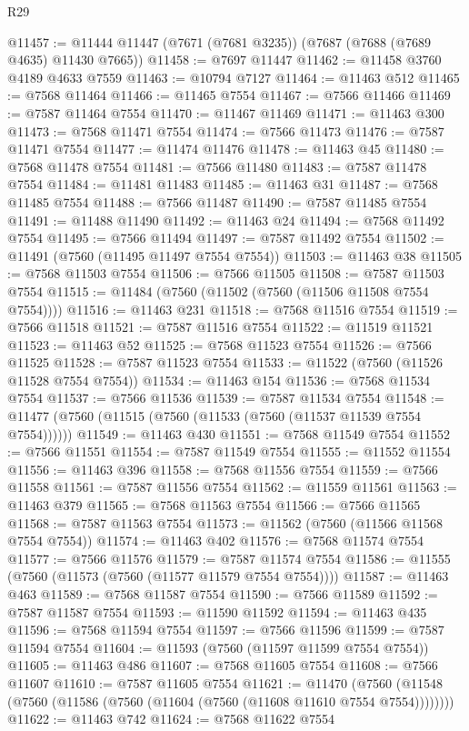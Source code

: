 \begin{lexlean}{R29}
\begin{coremodule}
@11457 := @11444 @11447 (@7671 (@7681 @3235)) (@7687 (@7688 (@7689 @4635) @11430 @7665))
@11458 := @7697 @11447
@11462 := @11458 @3760 @4189 @4633 @7559
@11463 := @10794 @7127
@11464 := @11463 @512
@11465 := @7568 @11464
@11466 := @11465 @7554
@11467 := @7566 @11466
@11469 := @7587 @11464 @7554
@11470 := @11467 @11469
@11471 := @11463 @300
@11473 := @7568 @11471 @7554
@11474 := @7566 @11473
@11476 := @7587 @11471 @7554
@11477 := @11474 @11476
@11478 := @11463 @45
@11480 := @7568 @11478 @7554
@11481 := @7566 @11480
@11483 := @7587 @11478 @7554
@11484 := @11481 @11483
@11485 := @11463 @31
@11487 := @7568 @11485 @7554
@11488 := @7566 @11487
@11490 := @7587 @11485 @7554
@11491 := @11488 @11490
@11492 := @11463 @24
@11494 := @7568 @11492 @7554
@11495 := @7566 @11494
@11497 := @7587 @11492 @7554
@11502 := @11491 (@7560 (@11495 @11497 @7554 @7554))
@11503 := @11463 @38
@11505 := @7568 @11503 @7554
@11506 := @7566 @11505
@11508 := @7587 @11503 @7554
@11515 := @11484 (@7560 (@11502 (@7560 (@11506 @11508 @7554 @7554))))
@11516 := @11463 @231
@11518 := @7568 @11516 @7554
@11519 := @7566 @11518
@11521 := @7587 @11516 @7554
@11522 := @11519 @11521
@11523 := @11463 @52
@11525 := @7568 @11523 @7554
@11526 := @7566 @11525
@11528 := @7587 @11523 @7554
@11533 := @11522 (@7560 (@11526 @11528 @7554 @7554))
@11534 := @11463 @154
@11536 := @7568 @11534 @7554
@11537 := @7566 @11536
@11539 := @7587 @11534 @7554
@11548 := @11477 (@7560 (@11515 (@7560 (@11533 (@7560 (@11537 @11539 @7554 @7554))))))
@11549 := @11463 @430
@11551 := @7568 @11549 @7554
@11552 := @7566 @11551
@11554 := @7587 @11549 @7554
@11555 := @11552 @11554
@11556 := @11463 @396
@11558 := @7568 @11556 @7554
@11559 := @7566 @11558
@11561 := @7587 @11556 @7554
@11562 := @11559 @11561
@11563 := @11463 @379
@11565 := @7568 @11563 @7554
@11566 := @7566 @11565
@11568 := @7587 @11563 @7554
@11573 := @11562 (@7560 (@11566 @11568 @7554 @7554))
@11574 := @11463 @402
@11576 := @7568 @11574 @7554
@11577 := @7566 @11576
@11579 := @7587 @11574 @7554
@11586 := @11555 (@7560 (@11573 (@7560 (@11577 @11579 @7554 @7554))))
@11587 := @11463 @463
@11589 := @7568 @11587 @7554
@11590 := @7566 @11589
@11592 := @7587 @11587 @7554
@11593 := @11590 @11592
@11594 := @11463 @435
@11596 := @7568 @11594 @7554
@11597 := @7566 @11596
@11599 := @7587 @11594 @7554
@11604 := @11593 (@7560 (@11597 @11599 @7554 @7554))
@11605 := @11463 @486
@11607 := @7568 @11605 @7554
@11608 := @7566 @11607
@11610 := @7587 @11605 @7554
@11621 := @11470
    (@7560 (@11548 (@7560 (@11586 (@7560 (@11604 (@7560 (@11608 @11610 @7554 @7554))))))))
@11622 := @11463 @742
@11624 := @7568 @11622 @7554

\end{coremodule}
\end{lexlean}
